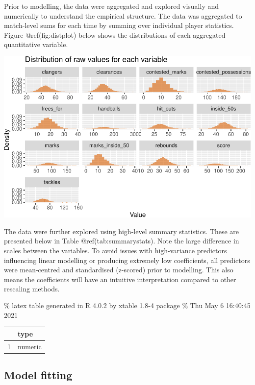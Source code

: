 \documentclass{article}
\begin{document}
Prior to modelling, the data were aggregated and explored visually and
numerically to understand the empirical structure. The data was
aggregated to match-level sums for each time by summing over individual
player statistics. Figure @ref(fig:distplot) below shows the
distributions of each aggregated quantitative variable.

\includegraphics{OLET5608_TrentHenderson_files/figure-latex/distplot-1.pdf}

The data were further explored using high-level summary statistics.
These are presented below in Table @ref(tab:summarystats). Note the
large difference in scales between the variables. To avoid issues with
high-variance predictors influencing linear modelling or producing
extremely low coefficients, all predictors were mean-centred and
standardised (z-scored) prior to modelling. This also means the
coefficients will have an intuitive interpretation compared to other
rescaling methods.

\% latex table generated in R 4.0.2 by xtable 1.8-4 package \% Thu May 6
16:40:45 2021

\begin{table}[ht]
\centering
\begin{tabular}{rl}
  \hline
 & type \\ 
  \hline
1 & numeric \\ 
   \hline
\end{tabular}
\end{table}

\hypertarget{model-fitting}{%
\subsection{Model fitting}\label{model-fitting}}
\end{document}
